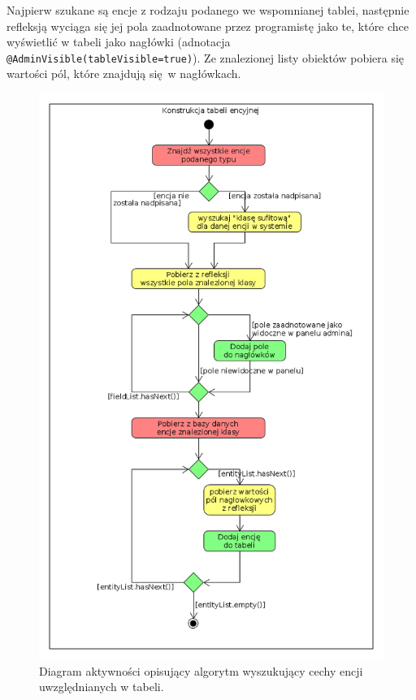 Najpierw szukane są encje z rodzaju podanego we wspomnianej tablei, następnie refleksją wyciąga się jej pola zaadnotowane przez programistę jako te, które chce wyświetlić w tabeli jako nagłówki (adnotacja \texttt{@AdminVisible(tableVisible=true)}). Ze znalezionej listy obiektów pobiera się wartości pól, które znajdują się w nagłówkach.
\begin{figure}
	\begin{center}
		\includegraphics[scale=0.5]{konsTabEnc.png}
	\end{center}
	\caption{{\color{black}Diagram aktywności opisujący algorytm wyszukujący cechy encji uwzględnianych w tabeli.}} \label{konsTabEnc}
\end{figure}

